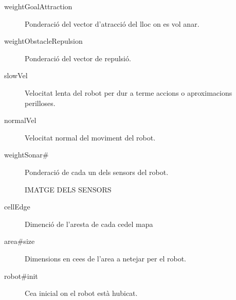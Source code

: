 \begin{description}
  \item[weightGoalAttraction] Ponderació del vector d'atracció del lloc on es vol anar.
  \item[weightObstacleRepulsion] Ponderació del vector de repulsió.

  \item[slowVel] Velocitat lenta del robot per dur a terme accions o aproximacions perilloses.
  \item[normalVel] Velocitat normal del moviment del robot.

  \item[weightSonar#] Ponderació de cada un dels sensors del robot.

IMATGE DELS SENSORS

\item[cellEdge] Dimenció de l'aresta de cada ce\lgem del mapa
\item[area#size] Dimensions en ce\lgem es de l'area a netejar per el robot.
\item[robot#init] Ce\lgem a inicial on el robot està hubicat.
\end{description}
